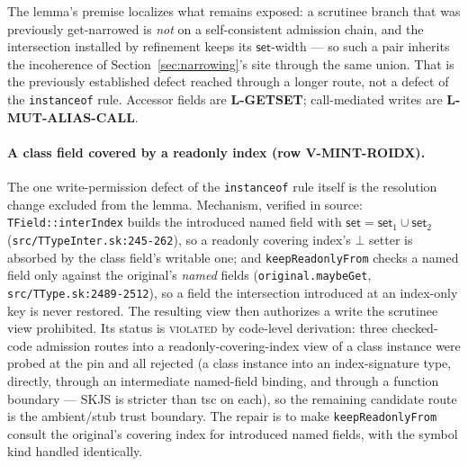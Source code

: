 \documentclass[11pt]{article}
\begin{document}
The lemma's premise localizes what remains exposed: a scrutinee branch
that was previously get-narrowed is \emph{not} on a self-consistent
admission chain, and the intersection installed by refinement keeps its
$\mathsf{set}$-width — so such a pair inherits the incoherence of
Section~\ref{sec:narrowing}'s site through the same union. That is the
previously established defect reached through a longer route, not a defect of
the \texttt{instanceof} rule. Accessor fields are \textbf{L-GETSET}; call-mediated
writes are \textbf{L-MUT-ALIAS-CALL}.

\paragraph{A class field covered by a readonly index (row V-MINT-ROIDX).}
The one write-permission defect of the \texttt{instanceof} rule itself is the
resolution change excluded from the lemma. Mechanism, verified in
source: \texttt{TField::interIndex} builds the introduced named field
with $\mathsf{set} = \mathsf{set}_1 \cup \mathsf{set}_2$
(\texttt{src/TTypeInter.sk:245-262}), so a readonly covering index's
$\bot$ setter is absorbed by the class field's writable one; and
\texttt{keepReadonlyFrom} checks a named field only against the
original's \emph{named} fields (\texttt{original.maybeGet},
\texttt{src/TType.sk:2489-2512}), so a field the intersection
introduced at an index-only key is never restored. The resulting view
then authorizes a write the scrutinee view prohibited. Its status is
\textsc{violated} by code-level derivation: three checked-code admission routes
into a readonly-covering-index view of a class instance were probed at
the pin and all rejected (a class instance into an index-signature
type, directly, through an intermediate named-field binding, and
through a function boundary — SKJS is stricter than tsc on each), so
the remaining candidate route is the ambient/stub trust boundary. The
repair is to make \texttt{keepReadonlyFrom} consult the original's
covering index for introduced named fields, with the symbol kind
handled identically.
\end{document}
